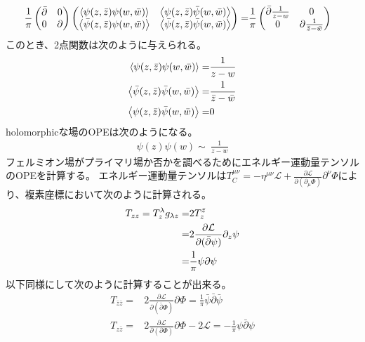 \documentclass[11pt, dvipdfmx]{article}
\numberwithin{equation}{section}
\begin{document}
\begin{align}
\frac{1}{\pi}\begin{pmatrix}
    \bar{\partial}&0 \\
      0 & \partial
    \end{pmatrix}\begin{pmatrix}
        \ev{\psi(z,\bar{z})\psi(w,\bar{w})} & \ev{\psi(z,\bar{z})\bar{\psi}(w,\bar{w})} \\
        \ev{\bar{\psi}(z,\bar{z})\psi(w,\bar{w})} & \ev{\bar{\psi}(z,\bar{z})\bar{\psi}(w,\bar{w})}\end{pmatrix}=&\frac{1}{\pi} \begin{pmatrix}
          \bar{\partial}\frac{1}{z-w} & 0 \\
        0  & \partial\frac{1}{\bar{z}-\bar{w}}
        \end{pmatrix}
\end{align}
このとき、2点関数は次のように与えられる。
\begin{align}
    \ev{\psi(z,\bar{z})\psi(w,\bar{w})}=& \frac{1}{z-w}\label{fermion 2point}\\
    \ev{\bar{\psi}(z,\bar{z})\bar{\psi}(w,\bar{w})}=& \frac{1}{\bar{z}-\bar{w}}\\
    \ev{\psi(z,\bar{z})\bar{\psi}(w,\bar{w})}=& 0
\end{align}
holomorphicな場のOPEは次のようになる。
\begin{align}
    \psi(z)\psi(w)\sim\  \frac{1}{z-w} 
\end{align}
フェルミオン場がプライマリ場か否かを調べるためにエネルギー運動量テンソルのOPEを計算する。
エネルギー運動量テンソルは$T^{\mu\nu}_C=-\eta^{\mu\nu}\mathcal{L}+\frac{\partial \mathcal{L}}{\partial (\partial_\mu \Phi)}\partial^\nu \Phi$により、複素座標において次のように計算される。
\begin{align}
    T_{zz}=T_{z}^\lambda g_{\lambda z}=&2T^{\bar{z}}_{z}\notag\\
    =&2\frac{\partial \mathcal{L}}{\partial(\bar{\partial} \psi)}\partial_z \psi\notag\\
    =&\frac{1}{\pi}\psi\partial \psi
\end{align}
以下同様にして次のように計算することが出来る。
\begin{align}
    T_{\bar{z}\bar{z}}=&2\frac{\partial \mathcal{L}}{\partial (\bar{\partial}\Phi)}\partial\Phi=\frac{1}{\pi}\bar{\psi} \bar{\partial} \bar{\psi}\\
    T_{z\bar{z}}=&2\frac{\partial \mathcal{L}}{\partial (\partial\Phi)}\partial\Phi -2\mathcal{L}=-\frac{1}{\pi}\psi \bar{\partial}\psi
\end{align}
\end{document}
